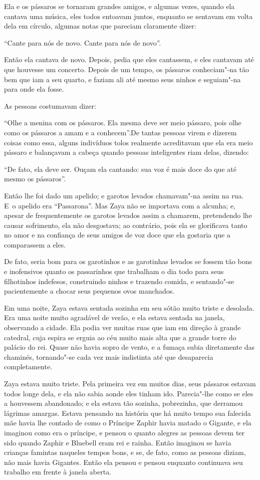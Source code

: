 Ela e os pássaros se tornaram grandes amigos, e algumas vezes, quando
ela cantava uma música, eles todos entoavam juntos, enquanto se sentavam
em volta dela em círculo, algumas notas que pareciam claramente dizer:

``Cante para nós de novo. Cante para nós de novo''.

Então ela cantava de novo. Depois, pedia que eles cantassem, e eles
cantavam até que houvesse um concerto. Depois de um tempo, os pássaros
conheciam"-na tão bem que iam a seu quarto, e faziam ali até mesmo seus
ninhos e seguiam"-na para onde ela fosse.

As pessoas costumavam dizer:

``Olhe a menina com os pássaros. Ela mesma deve ser meio pássaro, pois
olhe como os pássaros a amam e a conhecem''.De tantas pessoas virem e
dizerem coisas como essa, alguns indivíduos tolos realmente acreditavam
que ela era meio pássaro e balançavam a cabeça quando pessoas
inteligentes riam delas, dizendo:

``De fato, ela deve ser. Ouçam ela cantando: sua voz é mais doce do que
até mesmo os pássaros''.

Então lhe foi dado um apelido; e garotos levados chamavam"-na assim na
rua. E~o apelido era ``Passarona''. Mas Zaya não se importava com a
alcunha; e, apesar de frequentemente os garotos levados assim a
chamarem, pretendendo lhe causar sofrimento, ela não desgostava; ao
contrário, pois ela se glorificava tanto no amor e na confiança de seus
amigos de voz doce que ela gostaria que a comparassem a eles.

De fato, seria bom para os garotinhos e as garotinhas levados se fossem
tão bons e inofensivos quanto os passarinhos que trabalham o dia todo
para seus filhotinhos indefesos, construindo ninhos e trazendo comida, e
sentando"-se pacientemente a chocar seus pequenos ovos manchados.

Em uma noite, Zaya estava sentada sozinha em seu sótão muito triste e
desolada. Era uma noite muito agradável de verão, e ela estava sentada
na janela, observando a cidade. Ela podia ver muitas ruas que iam em
direção à grande catedral, cuja espira se erguia ao céu muito mais alta
que a grande torre do palácio do rei. Quase não havia sopro de vento, e
a fumaça subia diretamente das chaminés, tornando"-se cada vez mais
indistinta até que desaparecia completamente.

Zaya estava muito triste. Pela primeira vez em muitos dias, seus
pássaros estavam todos longe dela, e ela não sabia aonde eles tinham
ido. Parecia"-lhe como se eles a houvessem abandonado; e ela estava tão
sozinha, pobrezinha, que derramou lágrimas amargas. Estava pensando na
história que há muito tempo sua falecida mãe havia lhe contado de como o
Príncipe Zaphir havia matado o Gigante, e ela imaginou como era o
príncipe, e pensou o quanto alegres as pessoas devem ter sido quando
Zaphir e Bluebell eram rei e rainha. Então imaginou se havia crianças
famintas naqueles tempos bons, e se, de fato, como as pessoas diziam, não
mais havia Gigantes. Então ela pensou e pensou enquanto continuava seu
trabalho em frente à janela aberta.


